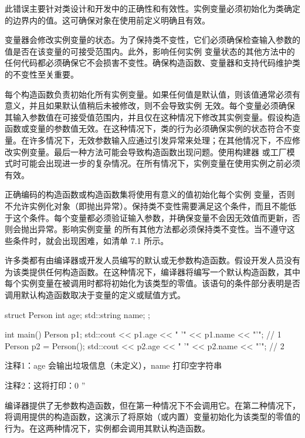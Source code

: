 此错误主要针对类设计和开发中的正确性和有效性。实例变量必须初始化为类确定的边界内的值。这可确保对象在使用前定义明确且有效。

变量器会修改实例变量的状态。为了保持类不变性，它们必须确保检查输入参数的值是否在该变量的可接受范围内。此外，影响任何实例 变量状态的其他方法中的任何代码都必须确保它不会损害不变性。确保构造函数、变量器和支持代码维护类的不变性至关重要。

每个构造函数负责初始化所有实例变量。如果任何值是默认值，则该值通常必须有意义，并且如果默认值稍后未被修改，则不会导致实例 无效。每个变量必须确保其输入参数值在可接受值范围内，并且仅在这种情况下修改其实例变量。假设构造函数或变量的参数值无效。在这种情况下，类的行为必须确保实例的状态符合不变量。在许多情况下，无效参数输入应通过引发异常来处理；在其他情况下，不应修改实例变量。最后一种方法可能会导致构造函数出现问题。使用构建器 或工厂模式时可能会出现进一步的复杂情况。在所有情况下，实例变量在使用实例之前必须有效。


正确编码的构造函数或构造函数集将使用有意义的值初始化每个实例 变量，否则不允许实例化对象（即抛出异常）。保持类不变性需要满足这个条件，而且不能低于这个条件。每个变量都必须验证输入参数，并确保变量不会因无效值而更新，否则会抛出异常。影响实例变量 的所有其他方法都必须保持类不变性。当不遵守这些条件时，就会出现困难，如清单 7.1 所示。

许多类都有由编译器或开发人员编写的默认或无参数构造函数。假设开发人员没有为该类提供任何构造函数。在这种情况下，编译器将编写一个默认构造函数，其中每个实例变量在被调用时都将初始化为该类型的零值。该语句的条件部分表明是否调用默认构造函数取决于变量的定义或赋值方式。


\begin{cpp}
struct Person {
  int age;
  std::string name;
};

int main() {
  Person p1;
  std::cout << p1.age << " '" << p1.name << "'\n"; // 1
  Person p2 = Person();
  std::cout << p2.age << " '" << p2.name << "'\n"; // 2
}
\end{cpp}

{\footnotesize
注释1：age 会输出垃圾信息（未定义），name 打印空字符串

注释2：这将打印：0 ''
}

编译器提供了无参数构造函数，但在第一种情况下不会调用它。在第二种情况下，将调用提供的构造函数，这演示了将原始（或内置）变量初始化为该类型的零值的行为。在这两种情况下，实例都会调用其默认构造函数。

